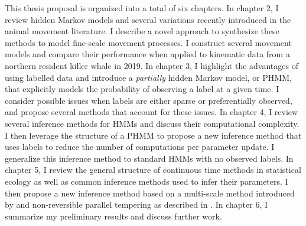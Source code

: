 This thesis proposal is organized into a total of six chapters. 
%
In chapter 2, I review hidden Markov models and several variations recently introduced in the animal movement literature. I describe a novel approach to synthesize these methods to model fine-scale movement processes. I construct several movement models and compare their performance when applied to kinematic data from a northern resident killer whale in 2019. 
%
In chapter 3, I highlight the advantages of using labelled data and introduce a \textit{partially} hidden Markov model, or PHMM, that explicitly models the probability of observing a label at a given time. I consider possible issues when labels are either sparse or preferentially observed, and propose several methods that account for these issues.
%
In chapter 4, I review several inference methods for HMMs and discuss their computational complexity. I then leverage the structure of a PHMM to propose a new inference method that uses labels to reduce the number of computations per parameter update. I generalize this inference method to standard HMMs with no observed labels.
%
In chapter 5, I review the general structure of continuous time methods in statistical ecology as well as common inference methods used to infer their parameters. I then propose a new inference method based on a multi-scale method introduced by \citet{Kou:2012} and non-reversible parallel tempering as described in \citet{Syed:2019}.
%
In chapter 6, I summarize my preliminary results and discuss further work.